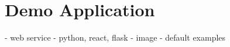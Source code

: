 \section{Demo Application}
\label{sec:demo}
- web service
- python, react, flask
- image
- default examples



